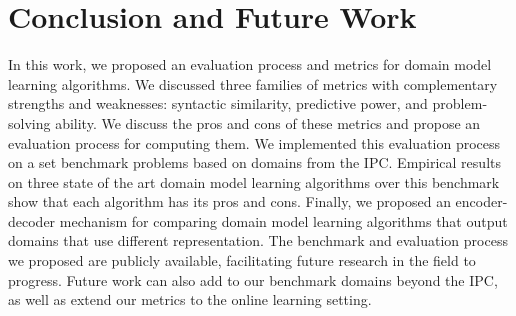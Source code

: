 \documentclass{article}
\theoremstyle{definition}
\theoremstyle{remark}
\newcommand{\sam}{\ac{SAM}\xspace}
\newif\ifaddcomments
\newcommand{\roni}[1]{\ifaddcomments{\textcolor{red}{[Roni: #1]}}\fi}
\begin{document}
\section{Conclusion and Future Work}
In this work, we proposed an evaluation process and metrics for domain model learning algorithms. We discussed three families of metrics with complementary strengths and weaknesses: syntactic similarity, predictive power, and problem-solving ability. 
We discuss the pros and cons of these metrics and propose an evaluation process for computing them. We implemented this evaluation process on a set benchmark problems based on domains from the IPC. 
Empirical results on three state of the art domain model learning algorithms over this benchmark show that each algorithm has its pros and cons. 
Finally, we proposed an encoder-decoder mechanism for comparing domain model learning algorithms that output domains that use different representation. 
The benchmark and evaluation process we proposed are publicly available, facilitating future research in the field to progress. Future work can also add to our benchmark domains beyond the IPC, as well as extend our metrics to the online learning setting. 








 


\end{document}
